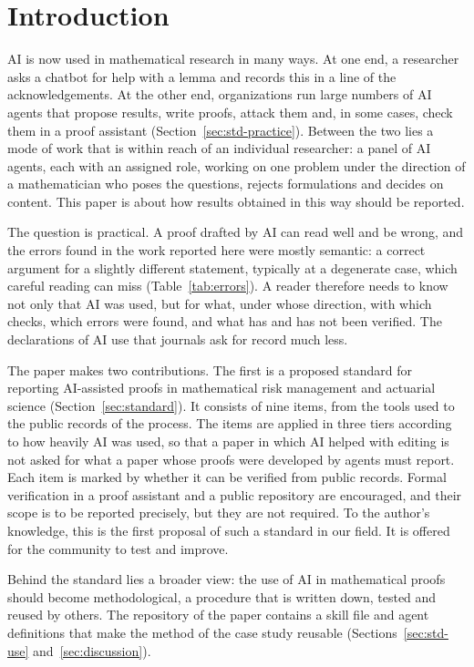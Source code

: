 \section{Introduction}\label{sec:intro}

AI is now used in mathematical research in many ways. At one end, a researcher asks a chatbot for help with a
lemma and records this in a line of the acknowledgements. At the other end, organizations run large numbers of AI
agents that propose results, write proofs, attack them and, in some cases, check them in a proof assistant
(Section~\ref{sec:std-practice}). Between the two lies a mode of work that is within reach of an individual
researcher: a panel of AI agents, each with an assigned role, working on one problem under the direction of a
mathematician who poses the questions, rejects formulations and decides on content. This paper is about how results
obtained in this way should be reported.

The question is practical. A proof drafted by AI can read well and be wrong, and the errors found in the work
reported here were mostly semantic: a correct argument for a slightly different statement, typically at a
degenerate case, which careful reading can miss (Table~\ref{tab:errors}). A reader therefore needs to know not
only that AI was used, but for what, under whose direction, with which checks, which errors were found, and what
has and has not been verified. The declarations of AI use that journals ask for record much less.

The paper makes two contributions. The first is a proposed standard for reporting AI-assisted proofs in
mathematical risk management and actuarial science (Section~\ref{sec:standard}). It consists of nine items, from
the tools used to the public records of the process. The items are applied in three tiers according to how heavily
AI was used, so that a paper in which AI helped with editing is not asked for what a paper whose proofs were
developed by agents must report. Each item is marked by whether it can be verified from public records.
Formal verification in a proof assistant and a public repository are encouraged, and their scope is to be
reported precisely, but they are not required. To the author's knowledge, this is the first proposal of such a
standard in our field. It is offered for the community to test and improve.

Behind the standard lies a broader view: the use of AI in mathematical proofs should become methodological, a
procedure that is written down, tested and reused by others. The repository of the paper contains a skill file and
agent definitions that make the method of the case study reusable (Sections~\ref{sec:std-use}
and~\ref{sec:discussion}).

